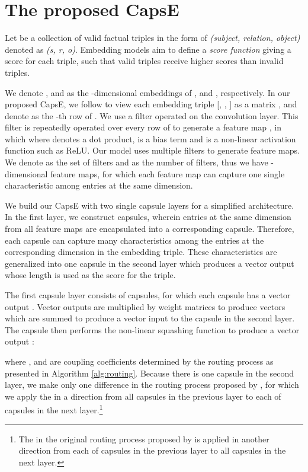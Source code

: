 \documentclass[11pt,a4paper]{article}
\begin{document}
\section{The proposed CapsE}
\label{sec:ourmodel}

Let  be a collection of valid factual triples in the form of \textit{(subject, relation, object)} denoted as \textit{(s, r, o)}. 
Embedding models aim to define a \textit{score function} giving a score for each triple, such that valid triples receive higher scores than invalid triples.

We denote ,  and  as the -dimensional embeddings of ,  and , respectively.
In our proposed CapsE, we follow \citet{Nguyen2018} to view each embedding triple [, , ] as a matrix , and denote  as the -th row of . 
We use a filter  operated on the convolution layer.
This filter  is repeatedly operated over every row of  to generate a feature map , in which
 where  denotes a dot product, 
 is a bias term and  is a non-linear activation function such as ReLU. 
Our model uses multiple filters  to generate feature maps. 
We denote  as the set of filters and  as the number of filters, thus we have  -dimensional feature maps, for which each feature map can capture one single characteristic among entries at the same dimension.

We build our CapsE with two single capsule layers for a simplified architecture.
In the first layer, we construct  capsules, wherein entries at the same dimension from all feature maps are encapsulated into a corresponding capsule. 
Therefore, each capsule can capture many characteristics among the entries at the corresponding dimension in the embedding triple. 
These characteristics are generalized into one capsule in the second layer which produces a vector output whose length is used as the score for the triple.

The first capsule layer consists of  capsules, for which each capsule  has a vector output .
Vector outputs  are multiplied by weight matrices  to produce vectors  which are summed to produce a vector input  to the capsule in the second layer.
The capsule then performs the non-linear squashing function to produce a vector output :

where , and  are coupling coefficients determined by the routing process as presented in Algorithm \ref{alg:routing}. 
Because there is one capsule in the second layer, we make only one difference in the routing process proposed by \citet{sabour2017dynamic}, for which we apply the  in a direction from all capsules in the previous layer to each of capsules in the next layer.\footnote{The  in the original routing process proposed by \citet{sabour2017dynamic} is applied in another direction from each of capsules in the previous layer to all capsules in the next layer.}
\end{document}
